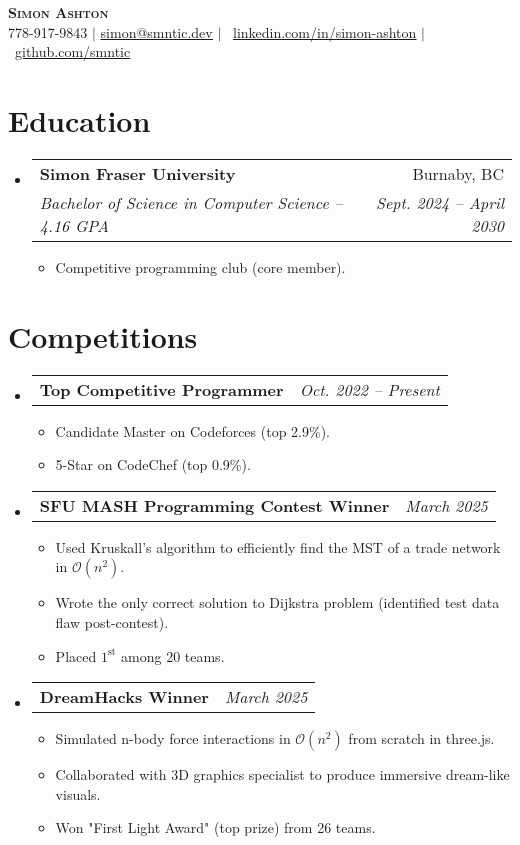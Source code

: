 \documentclass[letterpaper,11pt]{article}
\makeatletter
\newcommand{\resumeItem}[1]{
  \item\small{
    {#1 \vspace{-2pt}}
  }
}
\newcommand{\resumeSubheading}[5]{
  \vspace{-2pt}\item
    \begin{tabular*}{0.97\textwidth}[t]{l@{\extracolsep{\fill}}r}
      \textbf{#1} & #2 \\
      \textit{\small#3} & \textit{\small #4} \\
    \end{tabular*}
    \if\relax\detokenize{#5}\relax\else
      #5
    \fi
    \vspace{-7pt}
}
\newcommand{\resumeProjectHeading}[2]{
    \item
    \begin{tabular*}{0.97\textwidth}{l@{\extracolsep{\fill}}r}
      \small#1 & \textit{#2} \\
    \end{tabular*}\vspace{-7pt}
}
\newcommand{\resumeSubHeadingListStart}{\begin{itemize}[leftmargin=0.15in, label={}]}
\newcommand{\resumeSubHeadingListEnd}{\end{itemize}}
\newcommand{\resumeItemListStart}{\begin{itemize}[leftmargin=0.23in]}
\newcommand{\resumeItemListEnd}{\end{itemize}\vspace{-5pt}}
\newcommand{\bigO}{\mathcal{O}}
\makeatother
\begin{document}
\begin{center}
    \textbf{\Huge \scshape Simon Ashton} \\ \vspace{5pt}
    \small 778-917-9843 $|$ \href{mailto:simon@smntic.dev}{\underline{simon@smntic.dev}} $|$ 
    \raisebox{-0.05em}{\faLinkedin}\
    \href{https://linkedin.com/in/simon-ashton}{\underline{linkedin.com/in/simon-ashton}} $|$
    \raisebox{-0.1em}{\faGithub}\
    \href{https://github.com/smntic}{\underline{github.com/smntic}}
\end{center}


\section{Education}
  \resumeSubHeadingListStart
    \resumeSubheading
      {Simon Fraser University}{Burnaby, BC}
      {Bachelor of Science in Computer Science -- 4.16 GPA}{Sept. 2024 -- April 2030}
      \resumeItemListStart
        \resumeItem{Competitive programming club (core member).}
      \resumeItemListEnd
  \resumeSubHeadingListEnd


\section{Competitions}
    \resumeSubHeadingListStart
      \resumeProjectHeading
          {\textbf{Top Competitive Programmer}}{Oct. 2022 -- Present}
          \resumeItemListStart
            \resumeItem{Candidate Master on Codeforces (top 2.9\%).}
            \resumeItem{5-Star on CodeChef (top 0.9\%).}
          \resumeItemListEnd
      \resumeProjectHeading
          {\textbf{SFU MASH Programming Contest Winner}}{March 2025}
          \resumeItemListStart
            \resumeItem{Used Kruskall's algorithm to efficiently find the MST of a trade network in $\bigO(n^2)$.}
            \resumeItem{Wrote the only correct solution to Dijkstra problem (identified test data flaw post-contest).}
            \resumeItem{Placed $1^\text{st}$ among 20 teams.}
          \resumeItemListEnd
      \resumeProjectHeading
          {\textbf{DreamHacks Winner}}{March 2025}
          \resumeItemListStart
            \resumeItem{Simulated n-body force interactions in $\bigO(n^2)$ from scratch in three.js.}
            \resumeItem{Collaborated with 3D graphics specialist to produce immersive dream-like visuals.}
            \resumeItem{Won "First Light Award" (top prize) from 26 teams.}
          \resumeItemListEnd
    \resumeSubHeadingListEnd
\end{document}
